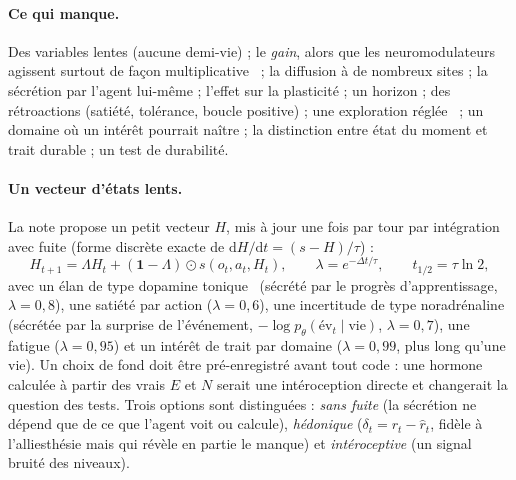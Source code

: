 \documentclass[11pt,a4paper]{article}
\begin{document}
\paragraph{Ce qui manque.} Des variables lentes (aucune demi-vie) ; le
\emph{gain}, alors que les neuromodulateurs agissent surtout de façon
multiplicative~\cite{servan1990,aston2005} ; la diffusion à de nombreux sites ; la
sécrétion par l'agent lui-même ; l'effet sur la plasticité ; un horizon ; des
rétroactions (satiété, tolérance, boucle positive) ; une exploration
réglée~\cite{doya2002,yu2005} ; un domaine où un intérêt pourrait naître ; la
distinction entre état du moment et trait durable ; un test de durabilité.

\paragraph{Un vecteur d'états lents.} La note propose un petit vecteur $H$, mis à
jour une fois par tour par intégration avec fuite (forme discrète exacte de
$\mathrm dH/\mathrm dt=(s-H)/\tau$) :
\begin{equation}
H_{t+1}=\Lambda H_t+(\mathbf 1-\Lambda)\odot s(o_t,a_t,H_t),\qquad
\lambda=e^{-\Delta t/\tau},\qquad t_{1/2}=\tau\ln2 ,
\label{eq-hormone}
\end{equation}
avec un élan de type dopamine tonique~\cite{niv2007} (sécrété par le progrès
d'apprentissage, $\lambda=0,8$), une satiété par action ($\lambda=0,6$), une
incertitude de type noradrénaline~\cite{yu2005} (sécrétée par la surprise de
l'événement, $-\log p_\theta(\text{év}_t\mid\text{vie})$, $\lambda=0,7$), une fatigue
($\lambda=0,95$) et un intérêt de trait par domaine ($\lambda=0,99$, plus long
qu'une vie). Un choix de fond doit être pré-enregistré avant tout code : une hormone
calculée à partir des vrais $E$ et $N$ serait une intéroception directe et
changerait la question des tests. Trois options sont distinguées : \emph{sans fuite}
(la sécrétion ne dépend que de ce que l'agent voit ou calcule), \emph{hédonique}
($\delta_t=r_t-\hat r_t$, fidèle à l'alliesthésie mais qui révèle en partie le
manque) et \emph{intéroceptive} (un signal bruité des niveaux).
\end{document}
